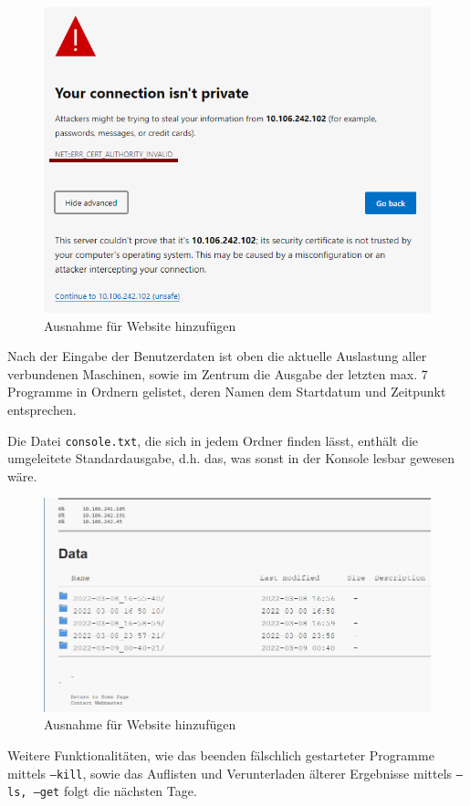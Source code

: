 \documentclass[11pt, a4paper]{article}
\begin{document}
\begin{figure}[h]
    \centering
    \includegraphics[width=0.7\linewidth]{./pics/2022-03-09_01-03_1.png}
    \caption{Ausnahme für Website hinzufügen}
    \label{fig:web-1}
\end{figure}

Nach der Eingabe der Benutzerdaten ist oben die aktuelle Auslastung aller verbundenen Maschinen, sowie im Zentrum die Ausgabe der letzten max. 7 Programme in Ordnern gelistet, deren Namen dem Startdatum und Zeitpunkt entsprechen.

Die Datei \texttt{console.txt}, die sich in jedem Ordner finden lässt, enthält die umgeleitete Standardausgabe, d.h. das, was sonst in der Konsole lesbar gewesen wäre.

\begin{figure}[h]
    \centering
    \includegraphics[width=0.7\linewidth]{./pics/2022-03-09_01-18.png}
    \caption{Ausnahme für Website hinzufügen}
    \label{fig:web-1}
\end{figure}

Weitere Funktionalitäten, wie das beenden fälschlich gestarteter Programme mittels \texttt{--kill}, sowie das Auflisten und Verunterladen älterer Ergebnisse mittels \texttt{--ls, --get} folgt die nächsten Tage.
\end{document}
